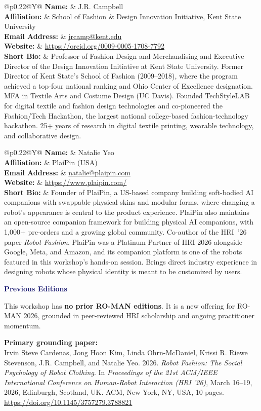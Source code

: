 \documentclass[12pt,letterpaper]{article}
\makeatletter
\newcommand{\FormField}[2]{\textbf{#1} & #2\\}
\newcommand{\FormSection}[1]{\par\vspace{0.75\baselineskip}\noindent{\color{MidnightBlue}\rule{\textwidth}{0.4pt}}\par\vspace{2pt}\noindent\textbf{\textcolor{MidnightBlue}{#1}}\par}
\newcommand{\FormBlockSep}{\par\vspace{0.5\baselineskip}}
\newcommand{\CoOrganizerBlock}[6]{%
  \begingroup
  \renewcommand{\arraystretch}{1.15}%
  \begin{tabularx}{\textwidth}{@{}p{0.22\textwidth}@{\hspace{1em}}Y@{}}
    \FormField{Name:}{#1}
    \FormField{Affiliation:}{#2}
    \FormField{Email Address:}{#4}
    \FormField{Website:}{#5}
    \FormField{Short Bio:}{#6}
  \end{tabularx}
  \endgroup
}
\newcommand{\TBD}{\textit{TBD}}
\makeatother
\begin{document}
\FormBlockSep
\CoOrganizerBlock
  {J.R. Campbell}
  {School of Fashion \& Design Innovation Initiative, Kent State University}
  {+1 330-672-0192}
  {\href{mailto:jrcamp@kent.edu}{jrcamp@kent.edu}}
  {\url{https://orcid.org/0009-0005-1708-7792}}
  {Professor of Fashion Design and Merchandising and Executive Director of the Design Innovation Initiative at Kent State University. Former Director of Kent State's School of Fashion (2009--2018), where the program achieved a top-four national ranking and Ohio Center of Excellence designation. MFA in Textile Arts and Costume Design (UC Davis). Founded TechStyleLAB for digital textile and fashion design technologies and co-pioneered the Fashion/Tech Hackathon, the largest national college-based fashion-technology hackathon. 25+ years of research in digital textile printing, wearable technology, and collaborative design.}
\FormBlockSep
\CoOrganizerBlock
  {Natalie Yeo}
  {PlaiPin (USA)}
  {\TBD}
  {\href{mailto:natalie@plaipin.com}{natalie@plaipin.com}}
  {\url{https://www.plaipin.com/}}
  {Founder of PlaiPin, a US-based company building soft-bodied AI companions with swappable physical skins and modular forms, where changing a robot's appearance is central to the product experience. PlaiPin also maintains an open-source companion framework for building physical AI companions, with 1,000+ pre-orders and a growing global community. Co-author of the HRI~'26 paper \textit{Robot Fashion}. PlaiPin was a Platinum Partner of HRI 2026 alongside Google, Meta, and Amazon, and its companion platform is one of the robots featured in this workshop's hands-on session. Brings direct industry experience in designing robots whose physical identity is meant to be customized by users.}

\FormSection{Previous Editions}
This workshop has \textbf{no prior RO-MAN editions}. It is a new offering for RO-MAN 2026, grounded in peer-reviewed HRI scholarship and ongoing practitioner momentum.

\FormBlockSep
\textbf{Primary grounding paper:}\\
Irvin Steve Cardenas, Jong Hoon Kim, Linda Ohrn-McDaniel, Krissi R. Riewe Stevenson, J.R. Campbell, and Natalie Yeo. 2026. \textit{Robot Fashion: The Social Psychology of Robot Clothing}. In \textit{Proceedings of the 21st ACM/IEEE International Conference on Human-Robot Interaction (HRI '26)}, March 16--19, 2026, Edinburgh, Scotland, UK. ACM, New York, NY, USA, 10 pages. \href{https://doi.org/10.1145/3757279.3788821}{https://doi.org/10.1145/3757279.3788821}
\end{document}
